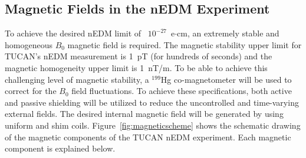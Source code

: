 




\subsection{Magnetic Fields in the nEDM Experiment}
To achieve the desired nEDM limit of ~$10^{-27}$~e$\cdot$cm, an
extremely stable and homogeneous $B_0$ magnetic field is required.
The magnetic stability upper limit for TUCAN's nEDM measurement is
1~pT (for hundreds of seconds) and the magnetic homogeneity upper
limit is 1~nT/m.
To be able to achieve this challenging level of magnetic stability, a
$^{199}$Hg co-magnetometer will be used to correct for the $B_0$ field
fluctuations. To achieve these specifications, both active and passive
shielding will be utilized to reduce the uncontrolled and time-varying
external fields. The desired internal magnetic field will be generated
by using uniform and shim coils. Figure~\ref{fig:magneticscheme} shows
the schematic drawing of the magnetic components of the TUCAN nEDM
experiment. Each magnetic component is explained below.


